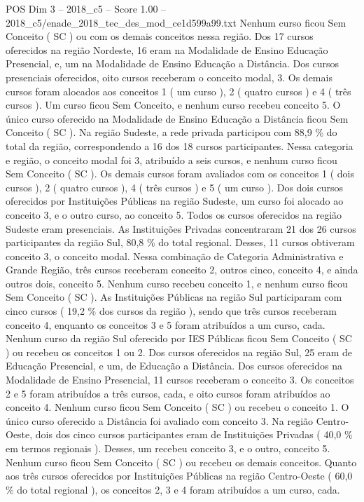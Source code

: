 \begin{textsample}{POS Dim 3 – 2018\_c5 – Score 1.00 – 2018\_c5/enade\_2018\_tec\_des\_mod\_ce1d599a99.txt}
Nenhum curso ficou Sem Conceito ( SC ) ou com os demais conceitos nessa região.
Dos 17 cursos oferecidos na região Nordeste, 16 eram na Modalidade de Ensino Educação Presencial, e, um na Modalidade de Ensino Educação a Distância.
Dos cursos presenciais oferecidos, oito cursos receberam o conceito modal, 3.
Os demais cursos foram alocados aos conceitos 1 ( um curso ), 2 ( quatro cursos ) e 4 ( três cursos ).
Um curso ficou Sem Conceito, e nenhum curso recebeu conceito 5.
O único curso oferecido na Modalidade de Ensino Educação a Distância ficou Sem Conceito ( SC ).
Na região Sudeste, a rede privada participou com 88,9 \% do total da região, correspondendo a 16 dos 18 cursos participantes.
Nessa categoria e região, o conceito modal foi 3, atribuído a seis cursos, e nenhum curso ficou Sem Conceito ( SC ).
Os demais cursos foram avaliados com os conceitos 1 ( dois cursos ), 2 ( quatro cursos ), 4 ( três cursos ) e 5 ( um curso ).
Dos dois cursos oferecidos por Instituições Públicas na região Sudeste, um curso foi alocado ao conceito 3, e o outro curso, ao conceito 5.
Todos os cursos oferecidos na região Sudeste eram presenciais.
As Instituições Privadas concentraram 21 dos 26 cursos participantes da região Sul, 80,8 \% do total regional.
Desses, 11 cursos obtiveram conceito 3, o conceito modal.
Nessa combinação de Categoria Administrativa e Grande Região, três cursos receberam conceito 2, outros cinco, conceito 4, e ainda outros dois, conceito 5.
Nenhum curso recebeu conceito 1, e nenhum curso ficou Sem Conceito ( SC ).
As Instituições Públicas na região Sul participaram com cinco cursos ( 19,2 \% dos cursos da região ), sendo que três cursos receberam conceito 4, enquanto os conceitos 3 e 5 foram atribuídos a um curso, cada.
Nenhum curso da região Sul oferecido por IES Públicas ficou Sem Conceito ( SC ) ou recebeu os conceitos 1 ou 2.
Dos cursos oferecidos na região Sul, 25 eram de Educação Presencial, e um, de Educação a Distância.
Dos cursos oferecidos na Modalidade de Ensino Presencial, 11 cursos receberam o conceito 3.
Os conceitos 2 e 5 foram atribuídos a três cursos, cada, e oito cursos foram atribuídos ao conceito 4.
Nenhum curso ficou Sem Conceito ( SC ) ou recebeu o conceito 1.
O único curso oferecido a Distância foi avaliado com conceito 3.
Na região Centro-Oeste, dois dos cinco cursos participantes eram de Instituições Privadas ( 40,0 \% em termos regionais ).
Desses, um recebeu conceito 3, e o outro, conceito 5.
Nenhum curso ficou Sem Conceito ( SC ) ou recebeu os demais conceitos.
Quanto aos três cursos oferecidos por Instituições Públicas na região Centro-Oeste ( 60,0 \% do total regional ), os conceitos 2, 3 e 4 foram atribuídos a um curso, cada.

\end{textsample}
